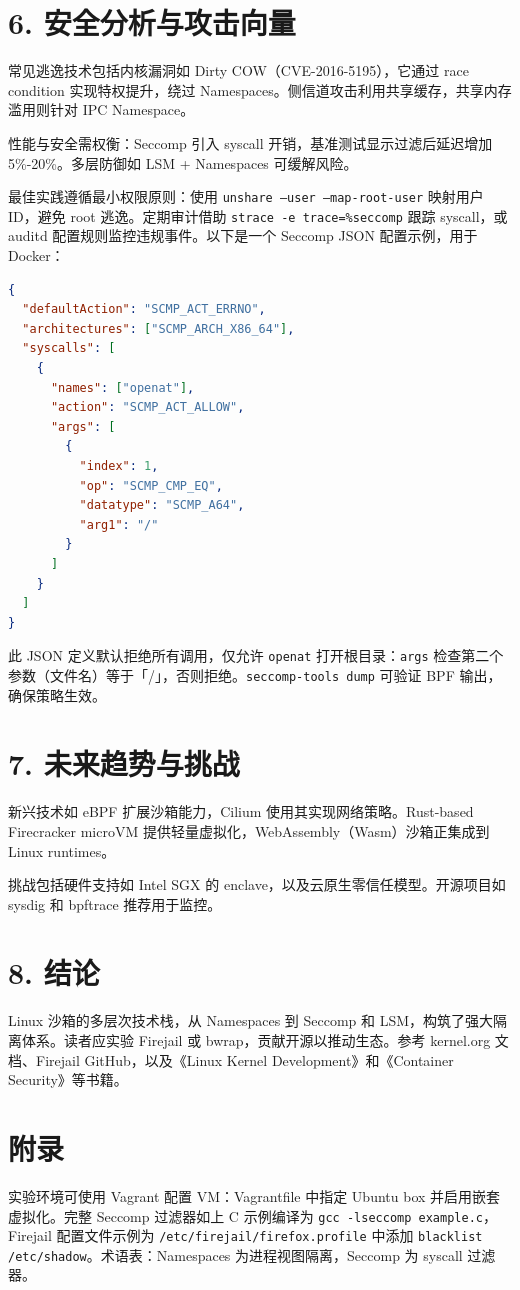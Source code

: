 \chapter{6. 安全分析与攻击向量}
常见逃逸技术包括内核漏洞如 Dirty COW（CVE-2016-5195），它通过 race condition 实现特权提升，绕过 Namespaces。侧信道攻击利用共享缓存，共享内存滥用则针对 IPC Namespace。\par
性能与安全需权衡：Seccomp 引入 syscall 开销，基准测试显示过滤后延迟增加 5\%{}-20\%{}。多层防御如 LSM + Namespaces 可缓解风险。\par
最佳实践遵循最小权限原则：使用 \texttt{unshare --user --map-root-user} 映射用户 ID，避免 root 逃逸。定期审计借助 \texttt{strace -e trace=\%{}seccomp} 跟踪 syscall，或 auditd 配置规则监控违规事件。以下是一个 Seccomp JSON 配置示例，用于 Docker：\par
\begin{lstlisting}[language=json]
{
  "defaultAction": "SCMP_ACT_ERRNO",
  "architectures": ["SCMP_ARCH_X86_64"],
  "syscalls": [
    {
      "names": ["openat"],
      "action": "SCMP_ACT_ALLOW",
      "args": [
        {
          "index": 1,
          "op": "SCMP_CMP_EQ",
          "datatype": "SCMP_A64",
          "arg1": "/"
        }
      ]
    }
  ]
}
\end{lstlisting}
此 JSON 定义默认拒绝所有调用，仅允许 \texttt{openat} 打开根目录：\texttt{args} 检查第二个参数（文件名）等于「/」，否则拒绝。\texttt{seccomp-tools dump} 可验证 BPF 输出，确保策略生效。\par
\chapter{7. 未来趋势与挑战}
新兴技术如 eBPF 扩展沙箱能力，Cilium 使用其实现网络策略。Rust-based Firecracker microVM 提供轻量虚拟化，WebAssembly（Wasm）沙箱正集成到 Linux runtimes。\par
挑战包括硬件支持如 Intel SGX 的 enclave，以及云原生零信任模型。开源项目如 sysdig 和 bpftrace 推荐用于监控。\par
\chapter{8. 结论}
Linux 沙箱的多层次技术栈，从 Namespaces 到 Seccomp 和 LSM，构筑了强大隔离体系。读者应实验 Firejail 或 bwrap，贡献开源以推动生态。参考 kernel.org 文档、Firejail GitHub，以及《Linux Kernel Development》和《Container Security》等书籍。\par
\chapter{附录}
实验环境可使用 Vagrant 配置 VM：Vagrantfile 中指定 Ubuntu box 并启用嵌套虚拟化。完整 Seccomp 过滤器如上 C 示例编译为 \texttt{gcc -lseccomp example.c}，Firejail 配置文件示例为 \texttt{/etc/firejail/firefox.profile} 中添加 \texttt{blacklist /etc/shadow}。术语表：Namespaces 为进程视图隔离，Seccomp 为 syscall 过滤器。\par
